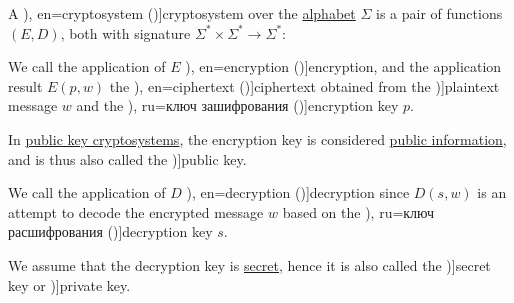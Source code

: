 \begin{definition}\label{def:cryptosystem}\mimprovised
  A \term[ru=криптосистема / шифрсистема (\cite[58]{Koblitz1994NumberTheoryAndCryptography}), en=cryptosystem (\cite[55]{Koblitz1994NumberTheoryAndCryptography})]{cryptosystem} over the \hyperref[def:formal_language/alphabet]{alphabet} \( \Sigma \) is a pair of functions \( (E, D) \), both with signature \( \Sigma^* \times \Sigma^* \to \Sigma^* \):

  \begin{thmenum}[series=def:cryptosystem]
     We call the application of \( E \) \term[en=шифрование (\cite[56]{АлферовИПр2002ОсновыКриптографии}), en=encryption (\cite[54]{Koblitz1994NumberTheoryAndCryptography})]{encryption}, and the application result \( E(p, w) \) the \term[ru=шифрованое сообщениe (\cite[56]{АлферовИПр2002ОсновыКриптографии}), en=ciphertext (\cite[54]{Koblitz1994NumberTheoryAndCryptography})]{ciphertext} obtained from the \term[en=plaintext (\cite[54]{Koblitz1994NumberTheoryAndCryptography})]{plaintext} message \( w \) and the \term[en=encryption key (\cite[120]{RivestShamirAdleman1978RSA}), ru=ключ зашифрования (\cite[59]{АлферовИПр2002ОсновыКриптографии})]{encryption key} \( p \).

    In \hyperref[def:symmetric_cryptosystem]{public key cryptosystems}, the encryption key is considered \hyperref[con:privacy]{public information}, and is thus also called the \term[en=public key (\cite[602]{GowersEtAl2008PrincetonCompanion})]{public key}.

     We call the application of \( D \) \term[ru=расшифрование (\cite[56]{АлферовИПр2002ОсновыКриптографии}), en=decryption (\cite[54]{Koblitz1994NumberTheoryAndCryptography})]{decryption} since \( D(s, w) \) is an attempt to decode the encrypted message \( w \) based on the \term[en=decryption key (\cite[122]{RivestShamirAdleman1978RSA}), ru=ключ расшифрования (\cite[59]{АлферовИПр2002ОсновыКриптографии})]{decryption key} \( s \).

    We assume that the decryption key is \hyperref[con:privacy]{secret}, hence it is also called the \term[en=private key (\cite[174]{AroraBarak2009ComputationalComplexity})]{secret key} or \term[en=private key (\cite[652]{RivestShamirAdleman1978RSA})]{private key}.


\end{thmenum}
\end{definition}

